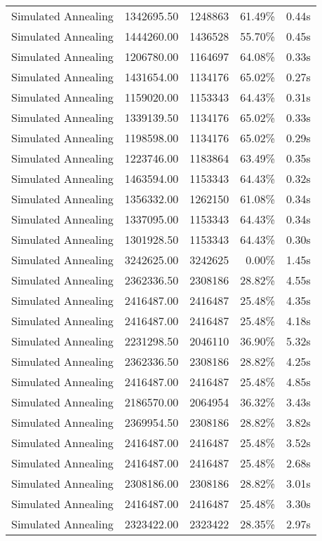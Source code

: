 \begin{table}[ht]
\begin{tabular}{|r|r|r|r|r|}
Simulated Annealing & 1342695.50 & 1248863 & 61.49\% & 0.44s\\
Simulated Annealing & 1444260.00 & 1436528 & 55.70\% & 0.45s\\
Simulated Annealing & 1206780.00 & 1164697 & 64.08\% & 0.33s\\
Simulated Annealing & 1431654.00 & 1134176 & 65.02\% & 0.27s\\
Simulated Annealing & 1159020.00 & 1153343 & 64.43\% & 0.31s\\
Simulated Annealing & 1339139.50 & 1134176 & 65.02\% & 0.33s\\
Simulated Annealing & 1198598.00 & 1134176 & 65.02\% & 0.29s\\
Simulated Annealing & 1223746.00 & 1183864 & 63.49\% & 0.35s\\
Simulated Annealing & 1463594.00 & 1153343 & 64.43\% & 0.32s\\
Simulated Annealing & 1356332.00 & 1262150 & 61.08\% & 0.34s\\
Simulated Annealing & 1337095.00 & 1153343 & 64.43\% & 0.34s\\
Simulated Annealing & 1301928.50 & 1153343 & 64.43\% & 0.30s\\
Simulated Annealing & 3242625.00 & 3242625 & 0.00\% & 1.45s\\
Simulated Annealing & 2362336.50 & 2308186 & 28.82\% & 4.55s\\
Simulated Annealing & 2416487.00 & 2416487 & 25.48\% & 4.35s\\
Simulated Annealing & 2416487.00 & 2416487 & 25.48\% & 4.18s\\
Simulated Annealing & 2231298.50 & 2046110 & 36.90\% & 5.32s\\
Simulated Annealing & 2362336.50 & 2308186 & 28.82\% & 4.25s\\
Simulated Annealing & 2416487.00 & 2416487 & 25.48\% & 4.85s\\
Simulated Annealing & 2186570.00 & 2064954 & 36.32\% & 3.43s\\
Simulated Annealing & 2369954.50 & 2308186 & 28.82\% & 3.82s\\
Simulated Annealing & 2416487.00 & 2416487 & 25.48\% & 3.52s\\
Simulated Annealing & 2416487.00 & 2416487 & 25.48\% & 2.68s\\
Simulated Annealing & 2308186.00 & 2308186 & 28.82\% & 3.01s\\
Simulated Annealing & 2416487.00 & 2416487 & 25.48\% & 3.30s\\
Simulated Annealing & 2323422.00 & 2323422 & 28.35\% & 2.97s\\

\end{tabular}
\end{table}
